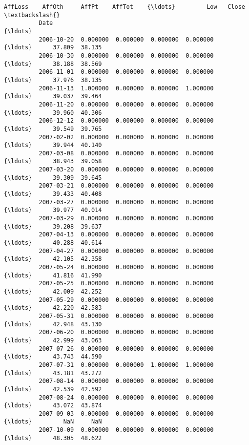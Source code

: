 \documentclass[11pt]{article}
\begin{document}
\begin{Verbatim}[commandchars=\\\{\}]
                       AffLoss    AffOth     AffPt    AffTot    {\ldots}         Low   Close  \textbackslash{}
          Date                                                  {\ldots}                       
          2006-10-20  0.000000  0.000000  0.000000  0.000000    {\ldots}      37.809  38.135   
          2006-10-30  0.000000  0.000000  0.000000  0.000000    {\ldots}      38.188  38.569   
          2006-11-01  0.000000  0.000000  0.000000  0.000000    {\ldots}      37.976  38.135   
          2006-11-13  1.000000  0.000000  0.000000  1.000000    {\ldots}      39.037  39.464   
          2006-11-20  0.000000  0.000000  0.000000  0.000000    {\ldots}      39.960  40.306   
          2006-12-12  0.000000  0.000000  0.000000  0.000000    {\ldots}      39.549  39.765   
          2007-02-02  0.000000  0.000000  0.000000  0.000000    {\ldots}      39.944  40.140   
          2007-03-08  0.000000  0.000000  0.000000  0.000000    {\ldots}      38.943  39.058   
          2007-03-20  0.000000  0.000000  0.000000  0.000000    {\ldots}      39.309  39.645   
          2007-03-21  0.000000  0.000000  0.000000  0.000000    {\ldots}      39.433  40.408   
          2007-03-27  0.000000  0.000000  0.000000  0.000000    {\ldots}      39.977  40.014   
          2007-03-29  0.000000  0.000000  0.000000  0.000000    {\ldots}      39.208  39.637   
          2007-04-13  0.000000  0.000000  0.000000  0.000000    {\ldots}      40.288  40.614   
          2007-04-27  0.000000  0.000000  0.000000  0.000000    {\ldots}      42.105  42.358   
          2007-05-24  0.000000  0.000000  0.000000  0.000000    {\ldots}      41.816  41.990   
          2007-05-25  0.000000  0.000000  0.000000  0.000000    {\ldots}      42.009  42.252   
          2007-05-29  0.000000  0.000000  0.000000  0.000000    {\ldots}      42.220  42.583   
          2007-05-31  0.000000  0.000000  0.000000  0.000000    {\ldots}      42.948  43.130   
          2007-06-20  0.000000  0.000000  0.000000  0.000000    {\ldots}      42.999  43.063   
          2007-07-26  0.000000  0.000000  0.000000  0.000000    {\ldots}      43.743  44.590   
          2007-07-31  0.000000  0.000000  1.000000  1.000000    {\ldots}      43.181  43.272   
          2007-08-14  0.000000  0.000000  0.000000  0.000000    {\ldots}      42.539  42.592   
          2007-08-24  0.000000  0.000000  0.000000  0.000000    {\ldots}      43.072  43.874   
          2007-09-03  0.000000  0.000000  0.000000  0.000000    {\ldots}         NaN     NaN   
          2007-10-09  0.000000  0.000000  0.000000  0.000000    {\ldots}      48.305  48.622   

\end{Verbatim}
\end{document}
